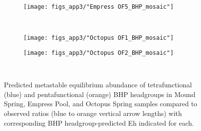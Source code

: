{\newpage

\begin{figure}[h]\ContinuedFloat
    \begin{subfigure}[b]{\linewidth}
    	\texttt{[image: figs\_app3/"Empress OF5\_BHP\_mosaic"]}
        \label{fig:EP5_degform}
    \end{subfigure}\\[-4ex]
    \begin{subfigure}[b]{\linewidth}
        \texttt{[image: figs\_app3/"Octopus OF1\_BHP\_mosaic"]}
        \label{fig:OS1_degform}
    \end{subfigure}
\end{figure}

\newpage

\begin{figure}[h]\ContinuedFloat
    \begin{subfigure}[b]{\linewidth}
        \texttt{[image: figs\_app3/"Octopus OF2\_BHP\_mosaic"]}
        \label{fig:OS2_degform}
    \end{subfigure}\\[-4ex]

\caption[Predicted metastable equilibrium abundance of tetrafunctional and pentafunctional BHP headgroups in Mound Spring, Empress Pool, and Octopus Spring samples]{Predicted metastable equilibrium abundance of tetrafunctional (blue) and pentafunctional (orange) BHP headgroups in Mound Spring, Empress Pool, and Octopus Spring samples compared to observed ratios (blue to orange vertical arrow lengths) with corresponding BHP headgroup-predicted Eh indicated for each.}
\label{fig:BHP_degree_formation}
\end{figure}

\clearpage
}




